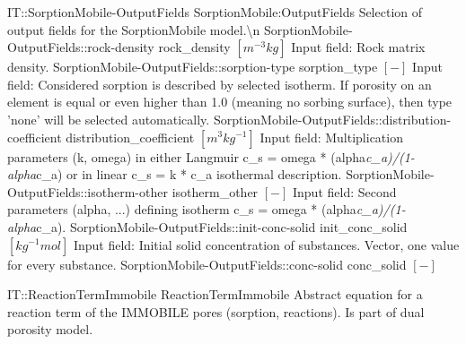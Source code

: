\begin{SelectionType}
	{IT::SorptionMobile-OutputFields}
	{SorptionMobile:OutputFields}
	{{{Selection of output fields for the SorptionMobile model.{\textbackslash}n}%
}}
		\SelectionItem
			{SorptionMobile-OutputFields::rock-density}
			{rock{\_}density}
			{{{}{$[m^{-3}kg]$}{ Input field: Rock matrix density.}%
}}
		\SelectionItem
			{SorptionMobile-OutputFields::sorption-type}
			{sorption{\_}type}
			{{{}{$[-]$}{ Input field: Considered sorption is described by selected isotherm.
If porosity on an element is equal or even higher than 1.0 (meaning no sorbing surface), then type 'none' will be selected automatically.}%
}}
		\SelectionItem
			{SorptionMobile-OutputFields::distribution-coefficient}
			{distribution{\_}coefficient}
			{{{}{$[m^{3}kg^{-1}]$}{ Input field: Multiplication parameters (k, omega) in either Langmuir c{\_}s = omega * (alpha}\textit{c{\_}a)/(1- alpha}{c{\_}a) or in linear c{\_}s = k * c{\_}a isothermal description.}%
}}
		\SelectionItem
			{SorptionMobile-OutputFields::isotherm-other}
			{isotherm{\_}other}
			{{{}{$[-]$}{ Input field: Second parameters (alpha, ...) defining isotherm  c{\_}s = omega * (alpha}\textit{c{\_}a)/(1- alpha}{c{\_}a).}%
}}
		\SelectionItem
			{SorptionMobile-OutputFields::init-conc-solid}
			{init{\_}conc{\_}solid}
			{{{}{$[kg^{-1}mol]$}{ Input field: Initial solid concentration of substances.
Vector, one value for every substance.}%
}}
		\SelectionItem
			{SorptionMobile-OutputFields::conc-solid}
			{conc{\_}solid}
			{{{}{$[-]$}{ }%
}}
\end{SelectionType}
\begin{AbstractType}
	{IT::ReactionTermImmobile}
	{ReactionTermImmobile}
	{}
	{{{Abstract equation for a reaction term of the IMMOBILE pores (sorption, reactions). Is part of dual porosity model.}%
}}
\end{AbstractType}
